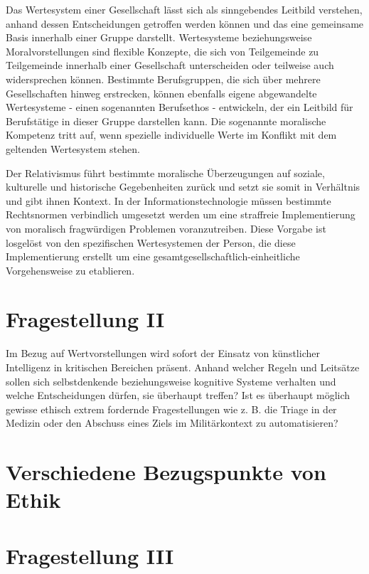 \documentclass[journal]{IEEEtran}
\begin{document}
\begin{onecolumn}
Das Wertesystem einer Gesellschaft lässt sich als sinngebendes Leitbild verstehen, anhand dessen 
Entscheidungen getroffen werden können und das eine gemeinsame Basis innerhalb einer Gruppe darstellt. 
Wertesysteme beziehungsweise Moralvorstellungen sind flexible Konzepte, die sich von Teilgemeinde zu 
Teilgemeinde innerhalb einer Gesellschaft unterscheiden oder teilweise auch widersprechen können. 
Bestimmte Berufsgruppen, die sich über mehrere Gesellschaften hinweg erstrecken, können ebenfalls eigene 
abgewandelte Wertesysteme - einen sogenannten Berufsethos - entwickeln, der ein Leitbild für Berufstätige 
in dieser Gruppe darstellen kann. Die sogenannte moralische Kompetenz tritt auf, wenn spezielle
individuelle Werte im Konflikt mit dem geltenden Wertesystem stehen.

Der Relativismus führt bestimmte moralische Überzeugungen auf soziale, kulturelle und historische
Gegebenheiten zurück und setzt sie somit in Verhältnis und gibt ihnen Kontext.
In der Informationstechnologie müssen bestimmte Rechtsnormen verbindlich umgesetzt werden um eine 
straffreie Implementierung von moralisch fragwürdigen Problemen voranzutreiben. Diese Vorgabe ist
losgelöst von den spezifischen Wertesystemen der Person, die diese Implementierung erstellt um eine
gesamtgesellschaftlich-einheitliche Vorgehensweise zu etablieren.

\section*{Fragestellung II}

Im Bezug auf Wertvorstellungen wird sofort der Einsatz von künstlicher Intelligenz in kritischen 
Bereichen präsent. Anhand welcher Regeln und Leitsätze sollen sich selbstdenkende beziehungsweise 
kognitive Systeme verhalten und welche Entscheidungen dürfen, sie überhaupt treffen? Ist es überhaupt 
möglich gewisse ethisch extrem fordernde Fragestellungen wie z. B. die Triage in der Medizin oder den
Abschuss eines Ziels im Militärkontext zu automatisieren?

\newpage

\section{Verschiedene Bezugspunkte von Ethik}

\section*{Fragestellung III}


\end{onecolumn}
\end{document}
